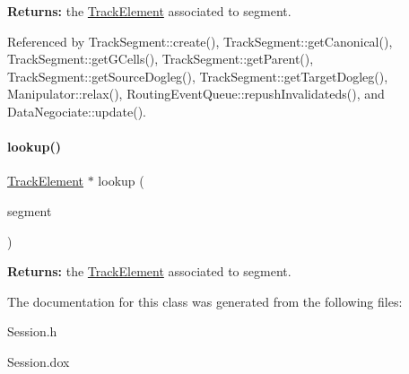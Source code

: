 {\bfseries Returns\+:} the \hyperlink{classKite_1_1TrackElement}{Track\+Element} associated to {\ttfamily segment}. 

Referenced by Track\+Segment\+::create(), Track\+Segment\+::get\+Canonical(), Track\+Segment\+::get\+G\+Cells(), Track\+Segment\+::get\+Parent(), Track\+Segment\+::get\+Source\+Dogleg(), Track\+Segment\+::get\+Target\+Dogleg(), Manipulator\+::relax(), Routing\+Event\+Queue\+::repush\+Invalidateds(), and Data\+Negociate\+::update().

\mbox{\label{classKite_1_1Session_a3946039ef19b5b6994171288f183bdaf}} 
\paragraph{\texorpdfstring{lookup()}{lookup()}\hspace{0.1cm}{\footnotesize\ttfamily [2/2]}}
{\footnotesize\ttfamily \hyperlink{classKite_1_1TrackElement}{Track\+Element} $\ast$ lookup (\begin{DoxyParamCaption}\item[{\textbf{ Auto\+Segment} $\ast$}]{segment }\end{DoxyParamCaption})\hspace{0.3cm}{\ttfamily [static]}}

{\bfseries Returns\+:} the \hyperlink{classKite_1_1TrackElement}{Track\+Element} associated to {\ttfamily segment}. 

The documentation for this class was generated from the following files\+:\begin{DoxyCompactItemize}
\item 
Session.\+h\item 
Session.\+dox\end{DoxyCompactItemize}
